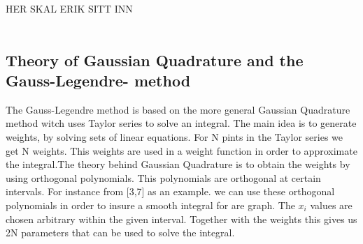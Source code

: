 \documentclass{article}
\begin{document}

HER SKAL ERIK SITT INN\\
\\
\subsection{Theory of Gaussian Quadrature and the Gauss-Legendre- method}

The Gauss-Legendre method is based on the more general Gaussian Quadrature method witch uses Taylor series to solve an integral. The main idea is to generate weights, by solving sets of linear equations. For N pints in the Taylor series we get N weights. This weights are used in a weight function in order to approximate the integral.The theory behind Gaussian Quadrature is to obtain the weights by using orthogonal polynomials. This polynomials are orthogonal at certain intervals. For instance from [3,7] as an example. we can use these orthogonal polynomials in order to insure a smooth integral for are graph. The $x_i$ values are chosen arbitrary within the given interval. Together with the weights this gives us 2N parameters that can be used to solve the integral.
\newline
\newline
\end{document}
